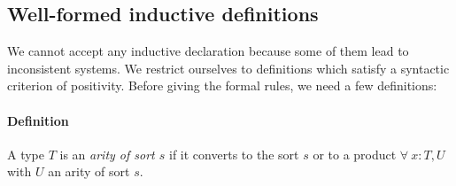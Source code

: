 


\subsection{Well-formed inductive definitions}
We cannot accept any inductive declaration because some of them lead
to inconsistent systems.
We restrict ourselves to definitions which
satisfy a syntactic criterion of positivity. Before giving the formal
rules, we need a few definitions:

\paragraph[Definition]{Definition\label{Arity}}
A type $T$ is an {\em arity of sort $s$} if it converts
to the sort $s$ or to a product $\forall~x:T,U$ with $U$ an arity
of sort $s$.


